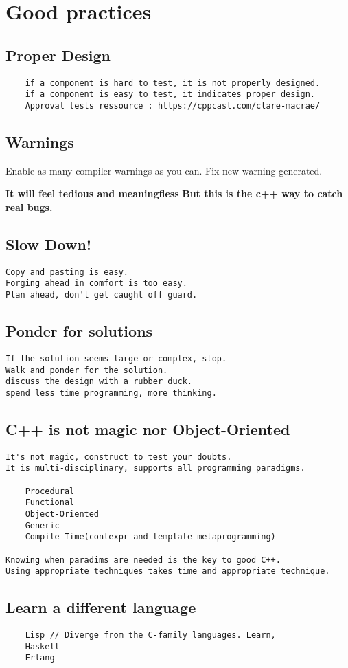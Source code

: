 \section{Good practices}

\subsection{Proper Design}

\begin{verbatim}
    if a component is hard to test, it is not properly designed. 
    if a component is easy to test, it indicates proper design. 
    Approval tests ressource : https://cppcast.com/clare-macrae/ 
\end{verbatim}

\subsection{Warnings}

Enable as many compiler warnings as you can. 
Fix new warning generated. 

\textbf{It will feel tedious and meaningfless}
\textbf{But this is the c++ way to catch real bugs.}

\subsection{Slow Down!}

\begin{verbatim}
Copy and pasting is easy. 
Forging ahead in comfort is too easy.
Plan ahead, don't get caught off guard. 
\end{verbatim}

\subsection{Ponder for solutions}

\begin{verbatim}
If the solution seems large or complex, stop. 
Walk and ponder for the solution. 
discuss the design with a rubber duck. 
spend less time programming, more thinking.
\end{verbatim}

\subsection{C++ is not magic nor Object-Oriented}

\begin{verbatim}
It's not magic, construct to test your doubts.
It is multi-disciplinary, supports all programming paradigms.

    Procedural
    Functional
    Object-Oriented
    Generic
    Compile-Time(contexpr and template metaprogramming)

Knowing when paradims are needed is the key to good C++.
Using appropriate techniques takes time and appropriate technique. 
\end{verbatim}

\subsection{Learn a different language}

\begin{verbatim}
    Lisp // Diverge from the C-family languages. Learn,
    Haskell
    Erlang
\end{verbatim}

